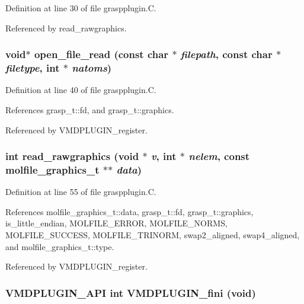 Definition at line 30 of file graspplugin.C.

Referenced by read\_\-rawgraphics.
\subsubsection{\setlength{\rightskip}{0pt plus 5cm}void$\ast$ open\_\-file\_\-read (const char $\ast$ {\em filepath}, const char $\ast$ {\em filetype}, int $\ast$ {\em natoms})\hspace{0.3cm}{\tt  [static]}}\label{graspplugin_8C_a3}




Definition at line 40 of file graspplugin.C.

References grasp\_\-t::fd, and grasp\_\-t::graphics.

Referenced by VMDPLUGIN\_\-register.
\subsubsection{\setlength{\rightskip}{0pt plus 5cm}int read\_\-rawgraphics (void $\ast$ {\em v}, int $\ast$ {\em nelem}, const {\bf molfile\_\-graphics\_\-t} $\ast$$\ast$ {\em data})\hspace{0.3cm}{\tt  [static]}}\label{graspplugin_8C_a4}




Definition at line 55 of file graspplugin.C.

References molfile\_\-graphics\_\-t::data, grasp\_\-t::fd, grasp\_\-t::graphics, is\_\-little\_\-endian, MOLFILE\_\-ERROR, MOLFILE\_\-NORMS, MOLFILE\_\-SUCCESS, MOLFILE\_\-TRINORM, swap2\_\-aligned, swap4\_\-aligned, and molfile\_\-graphics\_\-t::type.

Referenced by VMDPLUGIN\_\-register.
\subsubsection{\setlength{\rightskip}{0pt plus 5cm}VMDPLUGIN\_\-API int VMDPLUGIN\_\-fini (void)}\label{graspplugin_8C_a7}




